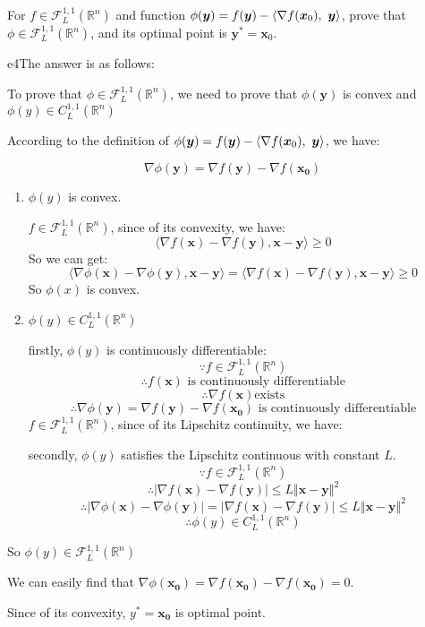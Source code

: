 \documentclass{article}
\newcommand{\xB}{\bm{x}}
\newcommand{\yB}{\bm{y}}
\newcommand{\RBB}{\mathbb{R}}
\newcommand{\FM}{\mathcal{F}}
\newcommand{\functiontype}[3]{\FM_{#1}^{#2,#3}(\RBB^n)}
\begin{document}
\begin{excercise}\label{e4}
For $f \in \functiontype{L}{1}{1}$ and function $\phi(\yB) = f(\yB) - \innerproduct{\nabla f(\xB_0)}{\yB}$, prove that $\phi \in \functiontype{L}{1}{1}$, and its optimal point is $\yB^* = \xB_0$.
\end{excercise}
\begin{PROOF}{e4}The answer is as follows:

	To prove that $\phi \in \functiontype{L}{1}{1}$, we need to prove that $\phi(\yB)$ is convex and $\phi (y)\in C_{L}^{1,1}(\RBB^n)$
	
	According to the definition of $\phi(\yB) = f(\yB) - \innerproduct{\nabla f(\xB_0)}{\yB}$, we have:
	
	\begin{equation}
		\nabla \phi(\yB)=\nabla f(\yB)-\nabla f(\bm{x_0})
	\end{equation}

	\begin{enumerate}
		\item  $\phi (y)$ is convex.
		
		$f\in \mathcal{F}_{L}^{1,1}(\mathbb{R}^n)$, since of its convexity, we have:
		\[
			\langle\nabla f(\xB)-\nabla f(\yB),\xB-\yB\rangle\ge 0
		\]
		So we can get:
		\begin{equation}
			\langle\nabla \phi(\xB)-\nabla \phi(\yB),\xB-\yB\rangle=\langle\nabla f(\xB)-\nabla f(\yB),\xB-\yB\rangle\ge 0
		\end{equation}
		So $\phi (x)$ is convex.
		\item $\phi (y)\in C_{L}^{1,1}(\RBB^n)$
		
		firstly, $\phi (y)$ is continuously differentiable:
		\[ \because f\in \mathcal{F}_{L}^{1,1}(\mathbb{R}^n)	\]
		\[ \therefore f(\xB) \text{ is continuously differentiable}\]
		\[ \therefore \nabla f(\xB) \text{exists}\]
		\[ \therefore \nabla \phi(\yB)=\nabla f(\yB)-\nabla f(\bm{x_0}) \text{ is continuously differentiable}\]
		$f\in \mathcal{F}_{L}^{1,1}(\mathbb{R}^n)$, since of its Lipschitz continuity, we have:

		secondly, $\phi(y)$ satisfies the Lipschitz continuous with constant $L$.
		\[ \because f\in \mathcal{F}_{L}^{1,1}(\mathbb{R}^n)	\]
		\[ \therefore \vert \nabla f(\xB)-\nabla f(\yB)\vert \le L\Vert \xB-\yB\Vert ^2\]
		\[ \therefore \vert \nabla \phi(\xB)-\nabla \phi(\yB)\vert=\vert \nabla f(\xB)-\nabla f(\yB)\vert \le L\Vert \xB-\yB\Vert ^2\]
		\[ \therefore \phi(y)\in C_L^{1,1}(\mathbb{R}^n)\]
	\end{enumerate}

		So $\phi(y)\in \mathcal{F}_L^{1,1}(\mathbb{R}^n)$


		We can easily find that $\nabla \phi(\bm{x_0}) = \nabla f(\bm{x_0})-\nabla f(\bm{x_0}) = 0$. 
		
		Since of its convexity, $y^*=\bm{x_0}$  is optimal point. 


\end{PROOF}
\end{document}
